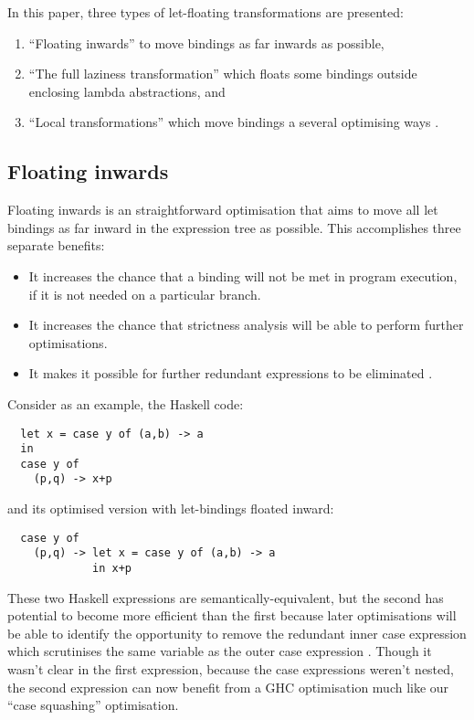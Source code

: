 In this paper, three types of let-floating transformations are presented:
\begin{enumerate}
\item ``Floating inwards'' to move bindings as far inwards as possible,
\item ``The full laziness transformation'' which floats some bindings outside enclosing lambda abstractions, and
\item ``Local transformations'' which move bindings a several optimising ways \citep{jones1996}.
\end{enumerate}

\subsection*{Floating inwards}

Floating inwards is an straightforward optimisation that aims to move all let bindings as far inward in the expression tree as possible. This accomplishes three separate benefits:
\begin{itemize}
\item It increases the chance that a binding will not be met in program execution, if it is not needed on a particular branch.
\item It increases the chance that strictness analysis will be able to perform further optimisations.
\item It makes it possible for further redundant expressions to be eliminated \citep{jones1996}.
\end{itemize}

Consider as an example, the Haskell code:
\begin{lstlisting}
  let x = case y of (a,b) -> a
  in
  case y of
    (p,q) -> x+p
\end{lstlisting}

and its optimised version with let-bindings floated inward:
\begin{lstlisting}
  case y of
    (p,q) -> let x = case y of (a,b) -> a
             in x+p
\end{lstlisting}

These two Haskell expressions are semantically-equivalent, but the second has potential to become more efficient than the first because later optimisations will be able to identify the opportunity to remove the redundant inner case expression which scrutinises the same variable as the outer case expression \citep{jones1996}. Though it wasn't clear in the first expression, because the case expressions weren't nested, the second expression can now benefit from a GHC optimisation much like our ``case squashing'' optimisation.

